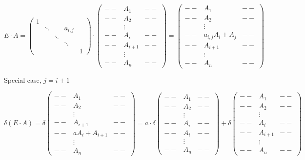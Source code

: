 {\begin{enumerate}[label=(Type: \roman*):, wide]
		      \[
			      E \cdot A = \begin{pmatrix} 1 & & & & \\ & \ddots & & a_{i,j} & \\ & & \ddots & & \\ & & & \ddots & \\ & & & & 1\end{pmatrix} \cdot \begin{pmatrix} -- & A_1 & -- \\ -- & A_2 & -- \\  & \vdots &  \\ -- & A_i & -- \\ -- & A_{i+1} & -- \\  & \vdots &  \\ -- & A_n & -- \end{pmatrix} = \begin{pmatrix} -- & A_1 & -- \\ -- & A_2 & -- \\  & \vdots &  \\ -- & a_{i,j} A_i + A_{j} & -- \\ -- & A_{i+1} & -- \\  & \vdots &  \\ -- & A_n & -- \end{pmatrix}
		      \]

		      Special case, \(j = i + 1\)

		      \[
			      \delta(E \cdot A) = \delta\begin{pmatrix} -- & A_1 & -- \\ -- & A_2 & -- \\  & \vdots &  \\ -- & A_{i+1} & -- \\ -- & aA_i + A_{i+1} & -- \\   & \vdots &  \\ -- & A_n & -- \end{pmatrix} = a \cdot \delta \begin{pmatrix} -- & A_1 & -- \\ -- & A_2 & -- \\  & \vdots &  \\ -- & A_i & -- \\ -- & A_i & -- \\  & \vdots &  \\ -- & A_n & -- \end{pmatrix} + \delta \begin{pmatrix} -- & A_1 & -- \\ -- & A_2 & -- \\  & \vdots &  \\ -- & A_i & -- \\ -- & A_{i+1} & -- \\  & \vdots &  \\ -- & A_n & -- \end{pmatrix}
		      \]


\end{enumerate}}
